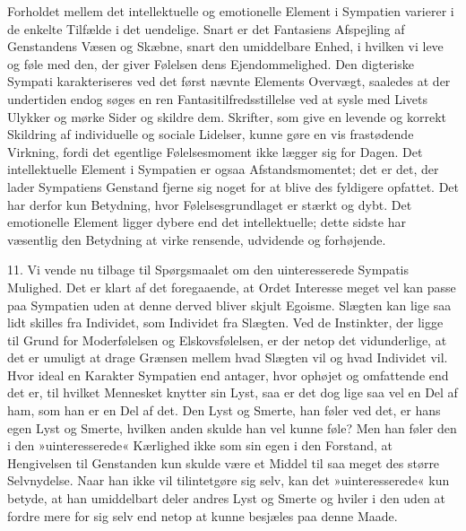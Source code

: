 \documentclass[12pt,a4paper,openany]{book}
\newcommand{\opage}[1]{\marginnote{\footnotesize\textit{[#1]}}}
\begin{document}
Forholdet mellem det intellektuelle og emotionelle Element i Sympatien
varierer i de enkelte Tilfælde i det uendelige. Snart er det Fantasiens
Afspejling af Genstandens Væsen og Skæbne, snart den umiddelbare Enhed,
i hvilken vi leve og føle med den, der giver Følelsen dens
Ejendommelighed. Den digteriske Sympati karakteriseres ved det først
nævnte Elements Overvægt, saaledes at der undertiden endog søges en ren
Fantasitilfredsstillelse ved at sysle med Livets Ulykker og mørke Sider
og skildre dem. Skrifter, som give en levende og korrekt Skildring af
individuelle og sociale Lidelser, kunne gøre en vis frastødende
Virkning, fordi det egentlige Følelsesmoment ikke lægger sig for Dagen.
Det intellektuelle Element i Sympatien er ogsaa Afstandsmomentet; det er
det, der lader Sympatiens Genstand fjerne sig noget for at blive des
fyldigere opfattet. Det har derfor kun Betydning, hvor
Følelsesgrundlaget er stærkt og dybt. Det emotionelle Element ligger
dybere
\opage{308}end det intellektuelle; dette sidste har væsentlig den
Betydning at virke rensende, udvidende og forhøjende.

11. Vi vende nu tilbage til Spørgsmaalet om den uinteresserede Sympatis
Mulighed. Det er klart af det foregaaende, at Ordet Interesse meget vel
kan passe paa Sympatien uden at denne derved bliver skjult Egoisme.
Slægten kan lige saa lidt skilles fra Individet, som Individet fra
Slægten. Ved de Instinkter, der ligge til Grund for Moderfølelsen og
Elskovsfølelsen, er der netop det vidunderlige, at det er umuligt at
drage Grænsen mellem hvad Slægten vil og hvad Individet vil. Hvor ideal
en Karakter Sympatien end antager, hvor ophøjet og omfattende end det
er, til hvilket Mennesket knytter sin Lyst, saa er det dog lige saa vel
en Del af ham, som han er en Del af det. Den Lyst og Smerte, han føler
ved det, er hans egen Lyst og Smerte, hvilken anden skulde han vel kunne
føle? Men han føler den i den »uinteresserede« Kærlighed ikke som sin
egen i den Forstand, at Hengivelsen til Genstanden kun skulde være et
Middel til saa meget des større Selvnydelse. Naar han ikke vil
tilintetgøre sig selv, kan det »uinteresserede« kun betyde, at han
umiddelbart deler andres Lyst og Smerte og hviler i den uden at fordre
mere for sig selv end netop at kunne besjæles paa denne Maade.
\end{document}
